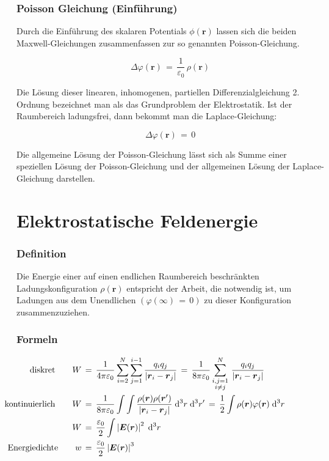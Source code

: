\documentclass[titlepage,11pt,a4paper,ngerman]{report}
\renewcommand{\vec}[1]{\boldsymbol{#1}}
\renewcommand{\epsilon}{\varepsilon}
\renewcommand{\paragraph}[1]{\subsubsection{#1}}
\begin{document}
\paragraph{Poisson Gleichung (Einführung)}
Durch die Einführung  des skalaren Potentials $\phi(\vec{r})$ lassen sich die beiden Maxwell-Gleichungen zusammenfassen zur so genannten Poisson-Gleichung.

\[\Delta\varphi(\vec{r})\,=\,\frac{1}{\epsilon_0}\,\rho(\vec{r})\]

Die Lösung dieser linearen, inhomogenen, partiellen Differenzialgleichung 2. Ordnung bezeichnet man als das Grundproblem der Elektrostatik. Ist der Raumbereich ladungsfrei, dann bekommt man die Laplace-Gleichung:

\[\Delta\varphi(\vec{r})\,=\,0\]

Die allgemeine Lösung der Poisson-Gleichung lässt sich als Summe einer speziellen Lösung der Poisson-Gleichung und der allgemeinen Lösung der Laplace-Gleichung darstellen.

\section{Elektrostatische Feldenergie}
\paragraph{Definition}
Die Energie einer auf einen endlichen Raumbereich beschränkten Ladungskonfiguration $\rho(\vec{r})$ entspricht der Arbeit, die notwendig ist, um Ladungen aus dem Unendlichen $(\varphi(\infty)\,=\,0)$ zu dieser Konfiguration zusammenzuziehen.

\paragraph{Formeln}
\begin{align*}
\llap{diskret}\qquad W\,&=\,\frac{1}{4\pi\epsilon_0}\sum_{i=2}^{N}\sum_{j=1}^{i-1}\frac{q_i q_j}{\left|\vec{r}_i - \vec{r}_j \right|}\,=\,\frac{1}{8\pi\epsilon_0}\sum_{\substack{i,j=1\\ i\neq j}}^{N}\,\frac{q_i q_j}{\left|\vec{r}_i - \vec{r}_j \right|}\\
\llap{kontinuierlich}\qquad W\,&=\,\frac{1}{8\pi\epsilon_0}\int\int\frac{\rho(\vec{r})\rho(\vec{r}')}{\left|\vec{r}_i - \vec{r}_j \right|}\;\mathrm{d}^3r\;\mathrm{d}^3r'\,=\,\frac{1}{2}\int\rho(\vec{r})\varphi(\vec{r})\;\mathrm{d}^3r\\
W\,&=\,\frac{\epsilon_0}{2}\int\left|\vec{E}(\vec{r})\right|^2\;\mathrm{d}^3r\\
\llap{Energiedichte}\qquad w\,&=\,\frac{\epsilon_0}{2}\left|\vec{E}(\vec{r})\right|^3
\end{align*}
\end{document}
